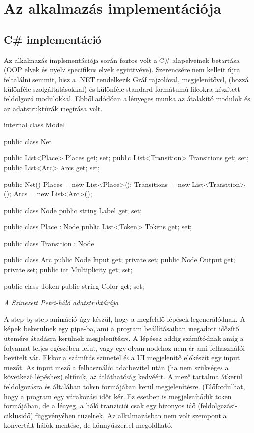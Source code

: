 \chapter{Az alkalmazás implementációja}
\section{C\# implementáció}
Az alkalmazás implementációja során fontos volt a C\# alapelveinek betartása (OOP elvek és nyelv specifikus elvek együttvéve). Szerencsére nem kellett újra feltalálni semmit, hisz a .NET rendelkezik Gráf rajzolóval, megjelenítővel, (hozzá különféle szolgáltatásokkal) és különféle standard formátumú fileokra készített feldolgozó modulokkal. Ebből adódóan a lényeges munka az átalakító modulok és az adatstruktúrák megírása volt. 
\begin{cpp}
internal class Model
    {
        public class Net
        {
            public List<Place> Places { get; set; }
            public List<Transition> Transitions { get; set; }
            public List<Arc> Arcs { get; set; }

            public Net()
            {
                Places = new List<Place>();
                Transitions = new List<Transition>();
                Arcs = new List<Arc>();
            }
        }

        public class Node
        {
            public string Label { get; set; }
        }

        public class Place : Node
        {
            public List<Token> Tokens { get; set; }
        }

        public class Transition : Node
        {

        }
        public class Arc
        {
            public Node Input { get; private set; }
            public Node Output { get; private set; }
            public int Multiplicity { get; set; }
        }

        public class Token
        {
            public string Color { get; set; }
        }
    }
\end{cpp}
\textsl{A Színezett Petri-háló adatstruktúrája}

A step-by-step animáció úgy készül, hogy a megfelelő lépések legenerálódnak. A képek bekerülnek egy pipe-ba, ami a program beállításaiban megadott időzítő ütemére átadásra kerülnek megjelenítésre. 
A lépések addig számítódnak amíg a folyamat teljes egészében lefut, vagy egy olyan nodehoz nem ér ami felhasználói bevitelt vár. Ekkor a számítás szünetel és a UI megjelenítő előkészít egy input mezőt. Az input mező a felhasználói adatbevitel után (ha nem szükséges a következő lépéshez) eltűnik, az átláthatóság kedvéért. A mező tartalma átkerül feldolgozásra és általában token formájában kerül megjelenítésre. (Előfordulhat, hogy a program egy várakozási időt kér. Ez esetben is megjelenítődik token formájában, de a lényeg, a háló tranziciói csak egy bizonyos idő (feldolgozási-ciklusidő) függvényében tüzelnek. Az alkalmazásban nem volt szempont a konvertált hálók mentése, de könnyűszerrel megoldható.

